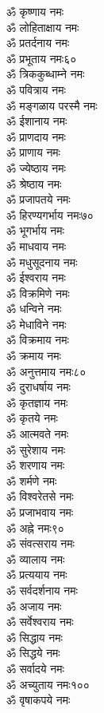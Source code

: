 \begin{center}
\begin{multicols}{2}
\begin{flushleft}
ॐ कृष्णाय नमः\\
ॐ लोहिताक्षाय नमः\\
ॐ प्रतर्दनाय नमः\\
ॐ प्रभूताय नमः\hfill ६०\\
ॐ त्रिककुब्धाम्ने नमः\\
ॐ पवित्राय  नमः\\
ॐ मङ्गळाय परस्मै नमः\\
ॐ ईशानाय नमः\\
ॐ प्राणदाय नमः\\
ॐ प्राणाय नमः\\
ॐ ज्येष्ठाय नमः\\
ॐ श्रेष्ठाय नमः\\
ॐ प्रजापतये नमः\\
ॐ हिरण्यगर्भाय नमः\hfill ७०\\
ॐ भूगर्भाय नमः\\
ॐ माधवाय नमः\\
ॐ मधुसूदनाय नमः\\
ॐ ईश्वराय नमः\\
ॐ विक्रमिणे नमः\\
ॐ धन्विने नमः\\
ॐ मेधाविने नमः\\
ॐ विक्रमाय नमः\\
ॐ क्रमाय नमः\\
ॐ अनुत्तमाय नमः\hfill ८०\\
ॐ दुराधर्षाय नमः\\
ॐ कृतज्ञाय नमः\\
ॐ कृतये नमः\\
ॐ आत्मवते नमः\\
ॐ सुरेशाय नमः\\
ॐ शरणाय नमः\\
ॐ शर्मणे नमः\\
ॐ विश्वरेतसे नमः\\
ॐ प्रजाभवाय नमः\\
ॐ अह्ने नमः\hfill ९०\\
ॐ संवत्सराय नमः\\
ॐ व्यालाय नमः\\
ॐ प्रत्ययाय नमः\\
ॐ सर्वदर्शनाय नमः\\
ॐ अजाय नमः\\
ॐ सर्वेश्वराय नमः\\
ॐ सिद्धाय नमः\\
ॐ सिद्धये नमः\\
ॐ सर्वादये नमः\\
ॐ अच्युताय नमः\hfill १००\\
ॐ वृषाकपये  नमः\\

\end{flushleft}
\end{multicols}
\end{center}

